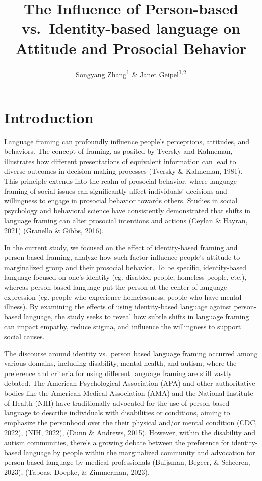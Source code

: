 \documentclass[
  man]{apa6}
\title{The Influence of Person-based vs.~Identity-based language on Attitude and Prosocial Behavior}
\author{Songyang Zhang\textsuperscript{1} \& Janet Geipel\textsuperscript{1,2}}
\date{}
\affiliation{\vspace{0.5cm}\textsuperscript{1} University of Chicago\\\textsuperscript{2} University of Exeter}
\begin{document}
\maketitle

\hypertarget{introduction}{%
\section{Introduction}\label{introduction}}

Language framing can profoundly influence people's perceptions, attitudes, and behaviors. The concept of framing, as posited by Tversky and Kahneman, illustrates how different presentations of equivalent information can lead to diverse outcomes in decision-making processes (Tversky \& Kahneman, 1981). This principle extends into the realm of prosocial behavior, where language framing of social issues can significantly affect individuals' decisions and willingness to engage in prosocial behavior towards others. Studies in social psychology and behavioral science have consistently demonstrated that shifts in language framing can alter prosocial intentions and actions (Ceylan \& Hayran, 2021) (Granello \& Gibbs, 2016).

In the current study, we focused on the effect of identity-based framing and person-based framing, analyze how such factor influence people's attitude to marginalized group and their prosocial behavior. To be specific, identity-based language focused on one's identity (eg. disabled people, homeless people, etc.), whereas person-based language put the person at the center of language expression (eg. people who experience homelessness, people who have mental illness). By examining the effects of using identity-based language against person-based language, the study seeks to reveal how subtle shifts in language framing can impact empathy, reduce stigma, and influence the willingness to support social causes.

The discourse around identity vs.~person based language framing occurred among various domains, including disability, mental health, and autism, where the preference and criteria for using different language framing are still vastly debated. The American Psychological Association (APA) and other authoritative bodies like the American Medical Association (AMA) and the National Institute of Health (NIH) have traditionally advocated for the use of person-based language to describe individuals with disabilities or conditions, aiming to emphasize the personhood over the their physical and/or mental condition (CDC, 2022), (NIH, 2022), (Dunn \& Andrews, 2015). However, within the disability and autism communities, there's a growing debate between the preference for identity-based language by people within the marginalized community and advocation for person-based language by medical professionals (Buijsman, Begeer, \& Scheeren, 2023), (Taboas, Doepke, \& Zimmerman, 2023).
\end{document}
